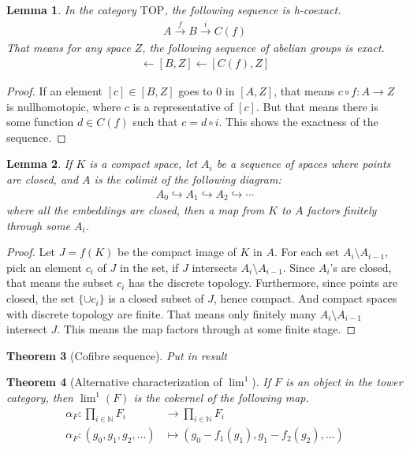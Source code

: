 \documentclass[12pt, notitlepage]{article}
\newtheorem{thm}{Theorem}[section]
\newtheorem{lem}[thm]{Lemma}
\theoremstyle{definition}
\newcommand{\cat}[1]{\mathrm{#1}}
\begin{document}
\begin{lem}
  In the category $\cat{TOP}$, the following sequence is h-coexact.
  \begin{align*}
    A \xrightarrow{f} B \xrightarrow{i} C(f)
  \end{align*}
  That means for any space $Z$, the following sequence of abelian groups is exact.
  \begin{align*}
    [A, Z] \leftarrow [B,Z] \leftarrow [C(f), Z]
  \end{align*}
\end{lem}

\begin{proof}
  If an element $[c] \in [B,Z]$ goes to $0$ in $[A, Z]$, that means $c \circ f: A \to Z$ is
  nullhomotopic, where $c$ is a representative of $[c]$. But that means there is some function
  $d \in C(f)$ such that $c = d \circ i$. This shows the exactness of the sequence.
\end{proof}

\begin{lem}
  If $K$ is a compact space, let $A_i$ be a sequence of spaces where points are closed, and $A$ is
  the colimit of the following diagram:
  \begin{align*}
    A_0 \hookrightarrow A_1 \hookrightarrow A_2 \hookrightarrow \cdots
  \end{align*}
  where all the embeddings are closed, then a map from $K$ to $A$ factors finitely through some
  $A_i$.
\end{lem}

\begin{proof}
  Let $J = f(K)$ be the compact image of $K$ in $A$. For each set $A_i \setminus A_{i-1}$, pick an
  element $c_i$ of $J$ in the set, if $J$ intersects $A_i \setminus A_{i-1}$. Since $A_i$'s are
  closed, that means the subset $c_i$ has the discrete topology. Furthermore, since points are
  closed, the set $\{\cup c_i\}$ is a closed subset of $J$, hence compact. And compact spaces with
  discrete topology are finite. That means only finitely many $A_i \setminus A_{i-1}$ intersect $J$.
  This means the map factors through at some finite stage.
\end{proof}

\begin{thm}[Cofibre sequence]
  Put in result
\end{thm}

\begin{thm}[Alternative characterization of $\lim^1$]
  If $F$ is an object in the tower category, then $\lim^1(F)$ is the cokernel of the following map.
  \begin{align*}
    \alpha_F : \prod_{i \in \mathbb{N}} F_i &\to \prod_{i \in \mathbb{N}} F_i \\
    \alpha_F : (g_0, g_1, g_2, \ldots) &\mapsto \left(g_0 - f_1(g_1), g_1 - f_2(g_2), \ldots \right)
  \end{align*}
\end{thm}
\end{document}
